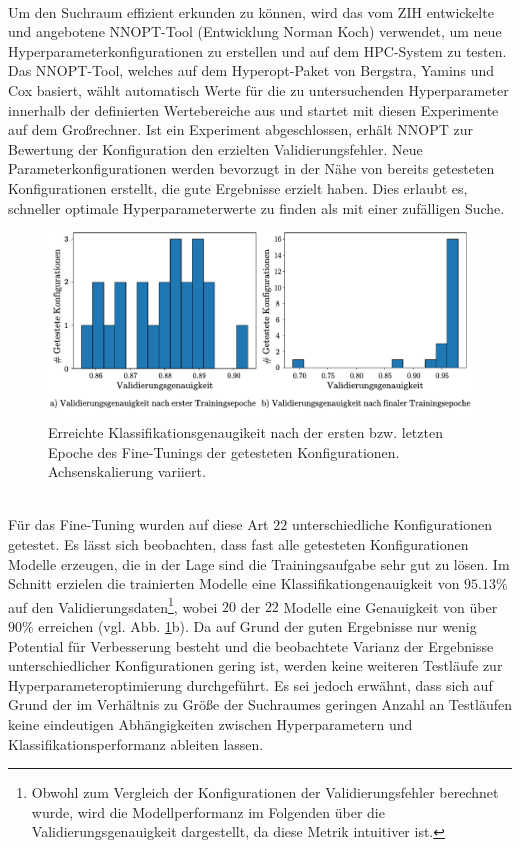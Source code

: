 \\
Um den Suchraum effizient erkunden zu können, wird das vom ZIH entwickelte und angebotene NNOPT-Tool (Entwicklung Norman Koch) verwendet, um neue Hyperparameterkonfigurationen zu erstellen und auf dem HPC-System zu testen. Das NNOPT-Tool, welches auf dem Hyperopt-Paket \cite{hyperopt} von Bergstra, Yamins und Cox basiert, wählt automatisch Werte für die zu untersuchenden Hyperparameter innerhalb der definierten Wertebereiche aus und startet mit diesen Experimente auf dem Großrechner. Ist ein Experiment abgeschlossen, erhält NNOPT zur Bewertung der Konfiguration den erzielten Validierungsfehler. Neue Parameterkonfigurationen werden bevorzugt in der Nähe von bereits getesteten Konfigurationen erstellt, die gute Ergebnisse erzielt haben. Dies erlaubt es, schneller optimale Hyperparameterwerte zu finden als mit einer zufälligen Suche.
\begin{figure}[h]
\includegraphics[scale=0.750]{NNOPT/init_and_end_perf_finetuning.pdf}
\caption{Erreichte Klassifikationsgenaugikeit nach der ersten bzw. letzten Epoche des Fine-Tunings der getesteten Konfigurationen. Achsenskalierung variiert.}
\label{finetuning_int_end}
\end{figure}
\\
Für das Fine-Tuning wurden auf diese Art $22$ unterschiedliche Konfigurationen getestet. Es lässt sich beobachten, dass fast alle getesteten Konfigurationen Modelle erzeugen, die in der Lage sind die Trainingsaufgabe sehr gut zu lösen. Im Schnitt erzielen die trainierten Modelle eine Klassifikationgenauigkeit von $95.13\%$ auf den Validierungsdaten\footnote{Obwohl zum Vergleich der Konfigurationen der Validierungsfehler berechnet wurde, wird die Modellperformanz im Folgenden über die Validierungsgenauigkeit dargestellt, da diese Metrik intuitiver ist.}, wobei $20$ der $22$ Modelle eine Genauigkeit von über $90\%$ erreichen (vgl. Abb. \ref{finetuning_int_end}b). Da auf Grund der guten Ergebnisse nur wenig Potential für Verbesserung besteht und die beobachtete Varianz der Ergebnisse unterschiedlicher Konfigurationen gering ist, werden keine weiteren Testläufe zur Hyperparameteroptimierung durchgeführt. Es sei jedoch erwähnt, dass sich auf Grund der im Verhältnis zu Größe der Suchraumes geringen Anzahl an Testläufen keine eindeutigen Abhängigkeiten zwischen Hyperparametern und Klassifikationsperformanz ableiten lassen.
